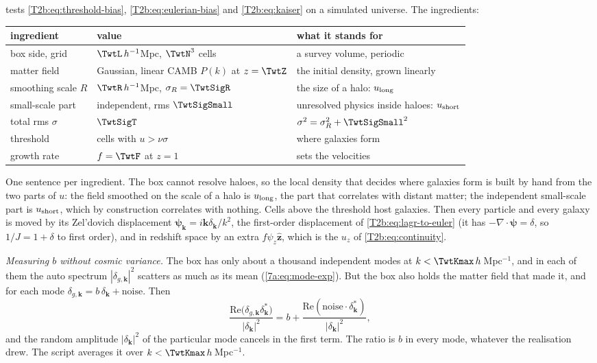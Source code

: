  tests \eqref{T2b:eq:threshold-bias}, \eqref{T2b:eq:eulerian-bias} and \eqref{T2b:eq:kaiser} on a simulated universe. The ingredients:
\begin{center}
\small
\begin{tabular}{@{}lll@{}}
\toprule
ingredient & value & what it stands for\\
\midrule
box side, grid & $\TwtL\,h^{-1}$Mpc, $\TwtN^3$ cells & a survey volume, periodic\\
matter field & Gaussian, linear CAMB $P(k)$ at $z=\TwtZ$ & the initial density, grown linearly\\
smoothing scale $R$ & $\TwtR\,h^{-1}$Mpc, $\sigma_R=\TwtSigR$ & the size of a halo: $u_{\rm long}$\\
small-scale part & independent, rms $\TwtSigSmall$ & unresolved physics inside haloes: $u_{\rm short}$\\
total rms $\sigma$ & $\TwtSigT$ & $\sigma^2=\sigma_R^2+\TwtSigSmall^2$\\
threshold & cells with $u>\nu\sigma$ & where galaxies form\\
growth rate & $f=\TwtF$ at $z=1$ & sets the velocities\\
\bottomrule
\end{tabular}
\end{center}
One sentence per ingredient. The box cannot resolve haloes, so the local density that decides where galaxies form is built by hand from the two parts of $u$: the field smoothed on the scale of a halo is $u_{\rm long}$, the part that correlates with distant matter; the independent small-scale part is $u_{\rm short}$, which by construction correlates with nothing. Cells above the threshold host galaxies. Then every particle and every galaxy is moved by its Zel'dovich displacement $\bm\psi_{\bm k}=i\bm k\delta_{\bm k}/k^2$, the first-order displacement of \eqref{T2b:eq:lagr-to-euler} (it has $-\nabla\cdot\bm\psi=\delta$, so $1/J=1+\delta$ to first order), and in redshift space by an extra $f\psi_z\hat{\bm z}$, which is the $u_z$ of \eqref{T2b:eq:continuity}.

\emph{Measuring $b$ without cosmic variance.} The box has only about a thousand independent modes at $k<\TwtKmax\,h$\,Mpc$^{-1}$, and in each of them the auto spectrum $|\delta_{g,\bm k}|^2$ scatters as much as its mean (\eqref{7a:eq:mode-exp}). But the box also holds the matter field that made it, and for each mode $\delta_{g,\bm k}=b\,\delta_{\bm k}+\text{noise}$. Then
\[
  \frac{\mathrm{Re}\big(\delta_{g,\bm k}\delta^*_{\bm k}\big)}{|\delta_{\bm k}|^2}=b+\frac{\mathrm{Re}(\text{noise}\cdot\delta^*_{\bm k})}{|\delta_{\bm k}|^2} ,
\]
and the random amplitude $|\delta_{\bm k}|^2$ of the particular mode cancels in the first term. The ratio is $b$ in every mode, whatever the realisation drew. The script averages it over $k<\TwtKmax\,h$\,Mpc$^{-1}$.

